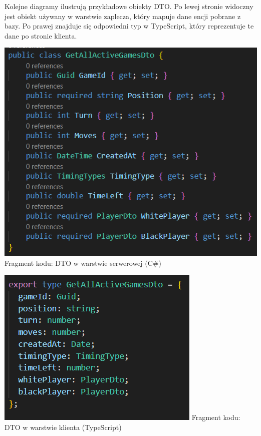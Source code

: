 \documentclass[12pt,a4paper]{article}
\begin{document}
\noindent
Kolejne diagramy ilustrują przykładowe obiekty DTO. Po lewej stronie widoczny jest obiekt używany w warstwie zaplecza, który mapuje dane encji pobrane z bazy. Po prawej znajduje się odpowiedni typ w TypeScript, który reprezentuje te dane po stronie klienta.

\vspace{1cm}
\begin{minipage}[t]{0.45\textwidth} 
    \vspace{0pt} 
    \centering 
    \includegraphics[width=\linewidth]{images/ex_dto_back.png} 
    Fragment kodu: DTO w warstwie serwerowej (C\#)
\end{minipage} 
\hfill 
\begin{minipage}[t]{0.45\textwidth} 
    \vspace{0pt} 
    \centering 
    \includegraphics[width=\linewidth]{images/ex_dto_front.png} 
    Fragment kodu: DTO w warstwie klienta (TypeScript)
\end{minipage}
\end{document}
